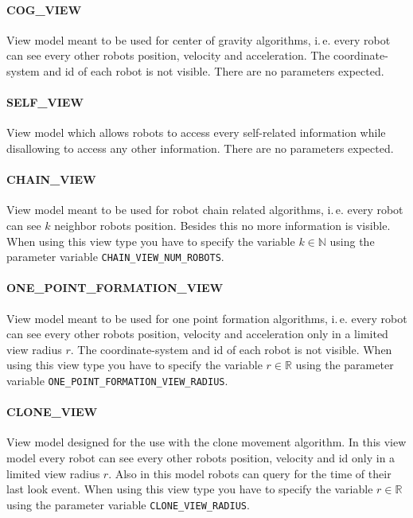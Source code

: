 \paragraph{COG\_VIEW} View model meant to be used for center of gravity algorithms, i.\,e. every robot can see every other robots position, velocity and acceleration. The coordinate-system and id of each robot is not visible. There are no parameters expected.

\paragraph{SELF\_VIEW} View model which allows robots to access every self-related information while disallowing to access any other information. There are no parameters expected.

\paragraph{CHAIN\_VIEW} View model meant to be used for robot chain related algorithms, i.\,e. every robot can see $k$ neighbor robots position. Besides this no more information is visible. When using this view type you have to specify the variable $k \in \mathbb{N}$ using the parameter variable \texttt{CHAIN\_VIEW\_NUM\_ROBOTS}.

\paragraph{ONE\_POINT\_FORMATION\_VIEW} View model meant to be used for one point formation algorithms, i.\,e. every robot can see every other robots position, velocity and acceleration only in a limited view radius $r$. The coordinate-system and id of each robot is not visible. When using this view type you have to specify the variable $r \in \mathbb{R}$ using the parameter variable \texttt{ONE\_POINT\_FORMATION\_VIEW\_RADIUS}.

\paragraph{CLONE\_VIEW} View model designed for the use with the clone movement algorithm. In this view model every robot can see every other robots position, velocity and id only in a limited view radius $r$. Also in this model robots can query for the time of their last look event. When using this view type you have to specify the variable $r \in \mathbb{R}$ using the parameter variable \texttt{CLONE\_VIEW\_RADIUS}.

